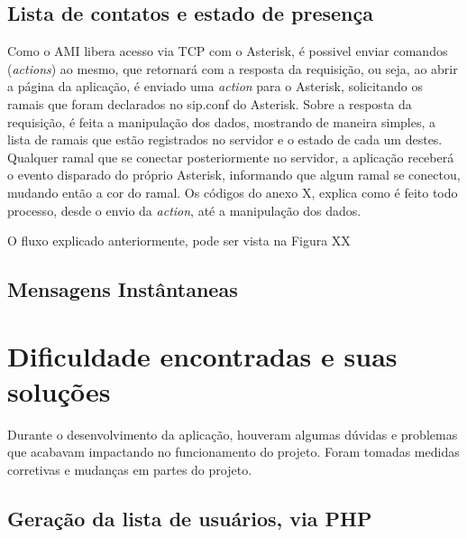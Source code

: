 \documentclass[ruledheader]{abnt} %
\begin{document}
  

\subsection{Lista de contatos e estado de presença}
\label{ss_listaContatoEestadoPresenca} %

  Como o AMI libera acesso via TCP com o Asterisk, é possivel enviar comandos (\textit{actions}) ao mesmo, que retornará com a resposta da requisição, ou seja, ao abrir a página da aplicação, é enviado uma \textit{action} para o Asterisk, solicitando os ramais que foram declarados no sip.conf do Asterisk. Sobre a resposta da requisição, é feita a manipulação dos dados, mostrando de maneira simples, a lista de ramais que estão registrados no servidor e o estado de cada um destes. Qualquer ramal que se conectar posteriormente no servidor, a aplicação receberá o evento disparado do próprio Asterisk, informando que algum ramal se conectou, mudando então a cor do ramal. Os códigos do anexo X, explica como é feito todo processo, desde o envio da \textit{action}, até a manipulação dos dados.
  
  O fluxo explicado anteriormente, pode ser vista na Figura XX

  
  
\subsection{Mensagens Instântaneas}
\label{ss_mensagensIntantaneas} %


\section{Dificuldade encontradas e suas soluções}
\label{s_dificuldadeEsolucoes} %

Durante o desenvolvimento da aplicação, houveram algumas dúvidas e problemas que acabavam impactando no funcionamento do projeto. Foram tomadas medidas corretivas e mudanças em partes do projeto.

\subsection{Geração da lista de usuários, via PHP}
  
\end{document}
